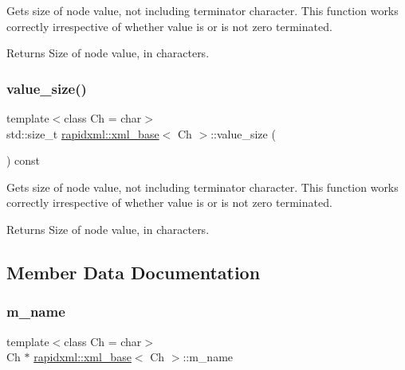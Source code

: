 Gets size of node value, not including terminator character. This function works correctly irrespective of whether value is or is not zero terminated. \begin{DoxyReturn}{Returns}
Size of node value, in characters. 
\end{DoxyReturn}
\mbox{\label{classrapidxml_1_1xml__base_a2eb123d471b1567fa4832b6ee2b75493}} 
\subsubsection{\texorpdfstring{value\+\_\+size()}{value\_size()}\hspace{0.1cm}{\footnotesize\ttfamily [2/2]}}
{\footnotesize\ttfamily template$<$class Ch  = char$>$ \\
std\+::size\+\_\+t \mbox{\hyperlink{classrapidxml_1_1xml__base}{rapidxml\+::xml\+\_\+base}}$<$ Ch $>$\+::value\+\_\+size (\begin{DoxyParamCaption}{ }\end{DoxyParamCaption}) const\hspace{0.3cm}{\ttfamily [inline]}}

Gets size of node value, not including terminator character. This function works correctly irrespective of whether value is or is not zero terminated. \begin{DoxyReturn}{Returns}
Size of node value, in characters. 
\end{DoxyReturn}


\subsection{Member Data Documentation}
\mbox{\label{classrapidxml_1_1xml__base_ac312b54c3278ce4604a0d7866cda9360}} 
\subsubsection{\texorpdfstring{m\+\_\+name}{m\_name}}
{\footnotesize\ttfamily template$<$class Ch  = char$>$ \\
Ch $\ast$ \mbox{\hyperlink{classrapidxml_1_1xml__base}{rapidxml\+::xml\+\_\+base}}$<$ Ch $>$\+::m\+\_\+name\hspace{0.3cm}{\ttfamily [protected]}}


